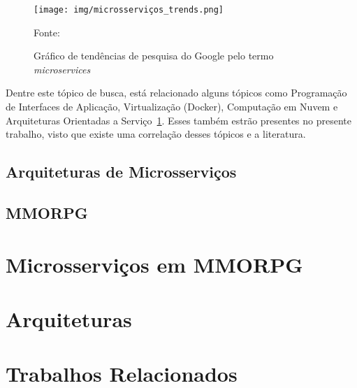 \begin{figure}[htb!]
  \caption{Gráfico de tendências de pesquisa do Google pelo termo \textit{microservices}}
  \label{fig:trends}
  \texttt{[image: img/microsserviços\_trends.png]}
  \centering

  Fonte:~\cite{google_trends:2018}
\end{figure}


Dentre este tópico de busca, está relacionado alguns tópicos como Programação de Interfaces de Aplicação, Virtualização (Docker), Computação em Nuvem e Arquiteturas Orientadas a Serviço~\ref{fig:trends}.
%
Esses também estrão presentes no presente trabalho, visto que existe uma correlação desses tópicos e a literatura.

\subsection{Arquiteturas de Microsserviços}

\subsection{MMORPG}

\section{Microsserviços em MMORPG}
\label{sec:microsserviços_de_mmorpg}

\section{Arquiteturas}
\label{sec:arquiteturas}


\section{Trabalhos Relacionados}
\label{sec:similares}
